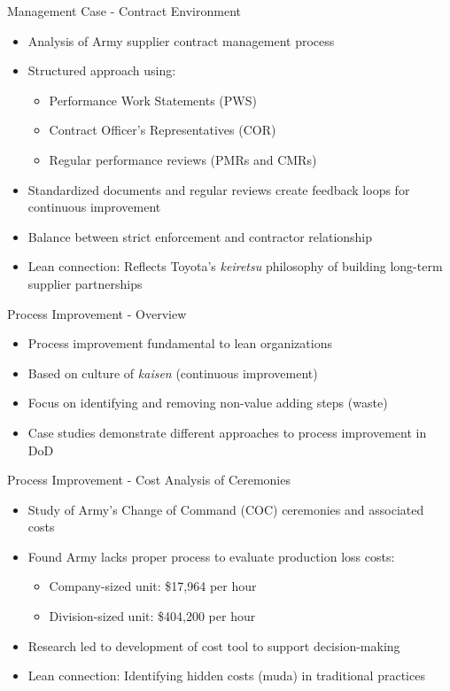 \documentclass[aspectratio=169,11pt,xcolor={dvipsnames},hyperref={pdftex,pdfpagemode=UseNone,hidelinks,pdfdisplaydoctitle=true},usepdftitle=false]{beamer}
\begin{document}
    \begin{frame}{Management Case - Contract Environment \cite{Carlstedt2020}}
      \begin{itemize}
        \item Analysis of Army supplier contract management process
        \item Structured approach using:
          \begin{itemize}
            \item Performance Work Statements (PWS)
            \item Contract Officer's Representatives (COR)
            \item Regular performance reviews (PMRs and CMRs)
          \end{itemize}
        \item Standardized documents and regular reviews create feedback loops for continuous improvement
        \item Balance between strict enforcement and contractor relationship
        \item Lean connection: Reflects Toyota's \textit{keiretsu} philosophy of building long-term supplier partnerships
      \end{itemize}
    \end{frame}


    \begin{frame}{Process Improvement - Overview}
      \begin{itemize}
        \item Process improvement fundamental to lean organizations
        \item Based on culture of \textit{kaisen} (continuous improvement)
        \item Focus on identifying and removing non-value adding steps (waste)
        \item Case studies demonstrate different approaches to process improvement in DoD
      \end{itemize}
    \end{frame}

    \begin{frame}{Process Improvement - Cost Analysis of Ceremonies \cite{Malin2020}}
      \begin{itemize}
        \item Study of Army's Change of Command (COC) ceremonies and associated costs
        \item Found Army lacks proper process to evaluate production loss costs:
          \begin{itemize}
            \item Company-sized unit: \$17,964 per hour
            \item Division-sized unit: \$404,200 per hour
          \end{itemize}
        \item Research led to development of cost tool to support decision-making
        \item Lean connection: Identifying hidden costs (muda) in traditional practices
      \end{itemize}
    \end{frame}
\end{document}
